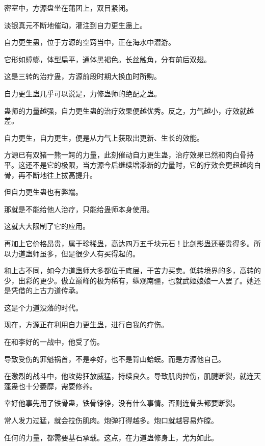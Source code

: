 
\begin{this_body}



密室中，方源盘坐在蒲团上，双目紧闭。

淡银真元不断地催动，灌注到自力更生蛊上。

自力更生蛊，位于方源的空窍当中，正在海水中潜游。

它形如蟑螂，体型扁平，通体黑褐色。长丝触角，分有前后双翅。

这是三转的治疗蛊，方源前段时期大换血时所购。

自力更生蛊几乎可以说是，力修蛊师的绝配之蛊。

蛊师的力量越强，自力更生蛊的治疗效果便越优秀。反之，力气越小，疗效就越差。

自力更生，自力更生，便是从力气上获取出更新、生长的效能。

方源已有双猪一熊一鳄的力量，此刻催动自力更生蛊，治疗效果已然和肉白骨持平。这还不是它的极限，当方源今后继续增添新的力量时，它的疗效会更超越肉白骨，再不断地往上拔高提升。

但自力更生蛊也有弊端。

那就是不能给他人治疗，只能给蛊师本身使用。

这就大大限制了它的应用。

再加上它价格昂贵，属于珍稀蛊，高达四万五千块元石！比剑影蛊还要贵得多。所以力道蛊师虽多，但是很少人有买得起的。

和上古不同，如今力道蛊师大多都位于底层，干苦力买卖。低转境界的多，高转的少，出彩的更少。傲立巅峰的极为稀有，纵观南疆，也就武姬娘娘一人罢了。她还是凭借的上古力道传承。

这是个力道没落的时代。

现在，方源正在利用自力更生蛊，进行自我的疗伤。

在和李好的一战中，他受了伤。

导致受伤的罪魁祸首，不是李好，也不是背山蛤蟆。而是方源他自己。

在激烈的战斗中，他攻势狂放威猛，持续良久。导致肌肉拉伤，肌腱断裂，就连天蓬蛊也十分萎靡，需要修养。

幸好他事先用了铁骨蛊，铁骨铮铮，没有什么事情。否则连骨头都要断裂。

常人发力过猛，就会拉伤肌肉。炮弹打得越多。炮口就越容易炸膛。

任何的力量，都需要基石承载。这点，在力道蛊修身上，尤为如此。


\end{this_body}
